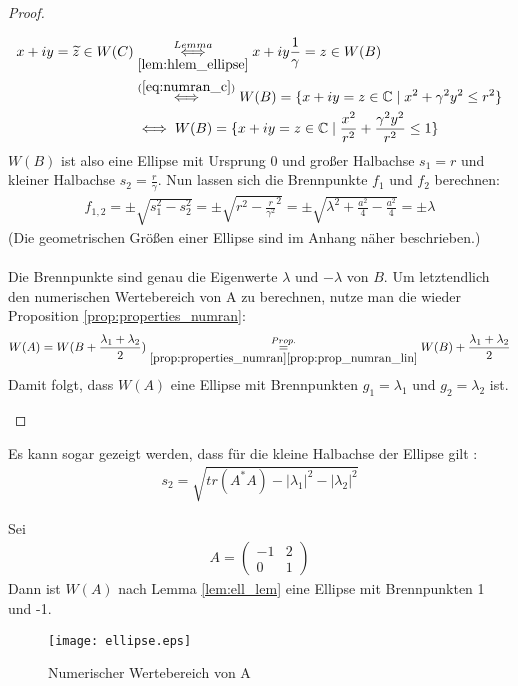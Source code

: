 \begin{proof}
\begin{enumerate}[label=\protect\circled{\arabic*}]
\begin{align*}
			x+iy=\widetilde{z} \in W(C) & \overset{Lemma}{\underset{\ref{lem:hlem_ellipse}}{\iff}} x+i{y}\frac{1}{\gamma}=z \in W(B)  \\
			& \overset{(\ref{eq:numran_c})}{\iff} W(B)=\{ x+iy=z \in \mathbb{C} \; | \; x^2 + \gamma^2y^2 \le r^2\} \\
			& \iff W(B)=\{ x+iy=z \in \mathbb{C} \; | \; \frac{x^2}{r^2} + \frac{\gamma^2y^2}{r^2} \le 1\}
		\end{align*}
		$W(B)$ ist also eine Ellipse mit Ursprung 0 und großer Halbachse $s_1=r$ und kleiner Halbachse $s_2=\frac{r}{\gamma}$. Nun lassen sich die Brennpunkte $f_1$ und $f_2$ berechnen:
		\begin{align*}
			f_{1,2} = \pm \sqrt{s_1^2-s_2^2} = \pm \sqrt{r^2-\frac{r}{\gamma^2}^2} = \pm \sqrt{\lambda^2+\frac{a^2}{4}-\frac{a^2}{4}} = \pm \lambda 
		\end{align*}	
		(Die geometrischen Größen einer Ellipse sind im Anhang näher beschrieben.)\\\\	
		Die Brennpunkte sind genau die Eigenwerte $\lambda$ und $-\lambda$ von $B$. Um letztendlich den numerischen Wertebereich von A zu berechnen, nutze man die wieder Proposition \ref{prop:properties_numran}:
		\begin{align*}
			W(A) = W(B+\frac{\lambda_1+\lambda_2}{2}) \overset{Prop.}{\underset{\ref{prop:properties_numran}\ref{prop:prop_numran_lin}}{=}} W(B) + \frac{\lambda_1+\lambda_2}{2}
		\end{align*}
		Damit folgt, dass $W(A)$ eine Ellipse mit Brennpunkten $g_1=\lambda_1$ und $g_2=\lambda_2$ ist.
	\end{enumerate}
\end{proof}

\begin{rem}
	Es kann sogar gezeigt werden, dass für die kleine Halbachse der Ellipse gilt \parencite[vgl. S. 3f]{gustafson1997numerical}:
	\begin{align*}
		s_2 = \sqrt{ tr(A^*A) - |\lambda_1|^2 - |\lambda_2|^2 }
	\end{align*}
\end{rem}

\begin{ex}
	Sei 
	\begin{align*}
		A = \begin{pmatrix}
			-1 & 2 \\
			0 & 1
		\end{pmatrix}
	\end{align*}
	Dann ist $W(A)$ nach Lemma \ref{lem:ell_lem} eine Ellipse mit Brennpunkten 1 und -1.
	\begin{figure}[H]
		\caption{Numerischer Wertebereich von A}
		\texttt{[image: ellipse.eps]}
	\end{figure}
\end{ex}

